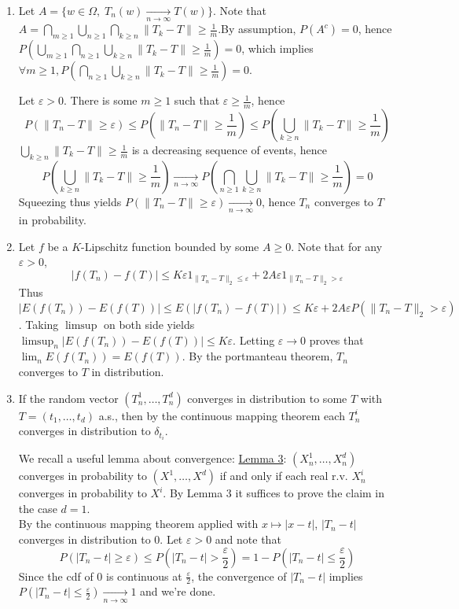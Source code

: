 \documentclass[a4paper,11pt]{article}
\begin{document}
\begin{enumerate}
  \item Let $A = \{w\in \Omega,\; T_n(w)\xrightarrow[n\to \infty]{} T(w)\}$. Note that $A = \bigcap_{m\geq 1} \bigcup_{n\geq 1} \bigcap_{k\geq n} \|T_k-T\|\geq \frac 1m$.\newline By assumption, $P(A^c)=0$, hence $P(\bigcup_{m\geq 1} \bigcap_{n\geq 1} \bigcup_{k\geq n} \|T_k-T\|\geq \frac 1m) = 0$, which implies $\forall m\geq 1, P(\bigcap_{n\geq 1} \bigcup_{k\geq n} \|T_k-T\|\geq \frac 1m) = 0$.

  Let $\varepsilon >0$. There is some $m\geq 1$ such that $\varepsilon \geq \frac 1m$, hence 
  $$P(\|T_n-T\|\geq \varepsilon) \leq P(\|T_n-T\|\geq \frac 1m) \leq P(\bigcup_{k\geq n} \|T_k-T\|\geq \frac 1m)$$
  $\bigcup_{k\geq n} \|T_k-T\|\geq \frac 1m$ is a decreasing sequence of events, hence $$P(\bigcup_{k\geq n} \|T_k-T\|\geq \frac 1m) \xrightarrow[n\to \infty]{} P(\bigcap_{n\geq 1} \bigcup_{k\geq n} \|T_k-T\|\geq \frac 1m) = 0$$
  Squeezing thus yields $P(\|T_n-T\|\geq \varepsilon) \xrightarrow[n\to \infty]{} 0$, hence $T_n$ converges to $T$ in probability.

  \item Let $f$ be a $K$-Lipschitz function bounded by some $A\geq 0$. Note that for any $\varepsilon >0$, $$|f(T_n)-f(T)|\leq K\varepsilon 1_{\|T_n-T\|_2\leq \varepsilon} + 2A \varepsilon 1_{\|T_n-T\|_2> \varepsilon}$$
  Thus $|E(f(T_n)) - E(f(T))|\leq E(|f(T_n)-f(T)|)\leq K\varepsilon + 2A \varepsilon P(\|T_n-T\|_2> \varepsilon)$.\newline
  Taking $\limsup$ on both side yields $\limsup_n |E(f(T_n)) - E(f(T))|\leq K\varepsilon $. Letting $\varepsilon \to 0$ proves that $\lim_n E(f(T_n)) = E(f(T))$. By the portmanteau theorem, $T_n$ converges to $T$ in distribution.

  \item If the random vector $(T_n^1,\ldots, T_n^d)$ converges in distribution to some $T$ with $T=(t_1,\ldots,t_d)$ a.s., then by the continuous mapping theorem each $T_n^i$ converges in distribution to $\delta_{t_i}$.

  We recall a useful lemma about convergence:\newline
  \underline{Lemma 3}: $(X_n^1,\ldots,X_n^d)$ converges in probability to $(X^1,\ldots,X^d)$ if and only if each real r.v. $X_n^i$ converges in probability to $X^i$. \newline
  By Lemma $3$ it suffices to prove the claim in the case $d=1$.\\
  By the continuous mapping theorem applied with $x\mapsto |x-t|$, $|T_n-t|$ converges in distribution to $0$. Let $\varepsilon >0$ and note that $$P(|T_n-t|\geq \varepsilon) \leq P(|T_n-t|> \frac{\varepsilon}2) = 1-P(|T_n-t|\leq \frac{\varepsilon}2)$$
  Since the cdf of $0$ is continuous at $\displaystyle \frac{\varepsilon}2$, the convergence of $|T_n-t|$ implies $\displaystyle P(|T_n-t|\leq \frac{\varepsilon}2) \xrightarrow[n\to \infty]{} 1$ and we're done.
\end{enumerate}
\end{document}
